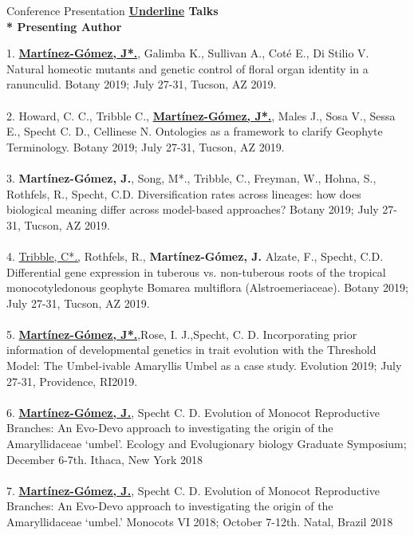 \documentclass{resume} %
\begin{document}
\begin{rSection}{Conference Presentation} 
\textbf{\underline{Underline} \textendash Talks}\\
\textbf{ * \textendash Presenting Author }

\begin{enumerate}[leftmargin=0cm]

1. \underline{\textbf{Mart\'{i}nez-G\'{o}mez, J*.}}, Galimba K., Sullivan A., Cot\'{e} E., Di Stilio V.
Natural homeotic mutants and genetic control of floral organ identity in a ranunculid.
Botany 2019; July 27-31, Tucson, AZ 2019. \\
\\
2. Howard, C. C., Tribble C., \underline{\textbf{Mart\'{i}nez-G\'{o}mez, J*.}}, Males J., Sosa V., Sessa E., Specht C. D., Cellinese N. 
Ontologies as a framework to clarify Geophyte Terminology. Botany 2019; July 27-31, Tucson, AZ 2019. \\
\\
3. \textbf{Mart\'{i}nez-G\'{o}mez, J.}, Song, M*., Tribble, C.,  Freyman, W., Hohna, S., Rothfels, R., Specht, C.D.
Diversification rates across lineages: how does biological meaning differ across model-based approaches?
Botany 2019; July 27-31, Tucson, AZ 2019. \\
\\
4. \underline{Tribble, C*.,} Rothfels, R., \textbf{Mart\'{i}nez-G\'{o}mez, J.} Alzate, F., Specht, C.D. Differential gene expression in tuberous vs. non-tuberous roots of the tropical monocotyledonous geophyte Bomarea multiflora (Alstroemeriaceae).
Botany 2019; July 27-31, Tucson, AZ 2019. \\
\\
5. \underline{\textbf{Mart\'{i}nez-G\'{o}mez, J*.}},Rose, I. J.,Specht, C. D.
Incorporating prior information of developmental genetics in trait evolution with the Threshold Model: The Umbel-ivable Amaryllis Umbel as a case study. 
Evolution 2019; July 27-31, Providence,  RI2019. \\
\\
6. \underline{\textbf{Mart\'{i}nez-G\'{o}mez, J.}}, Specht C. D. Evolution of Monocot Reproductive Branches: An Evo-Devo approach to investigating the origin
of the Amaryllidaceae ‘umbel’. Ecology and Evolugionary biology Graduate Symposium; December 6-7th. Ithaca, New York 2018\\
\\
7. \underline{\textbf{Mart\'{i}nez-G\'{o}mez, J.}}, Specht C. D. Evolution of Monocot Reproductive Branches: An Evo-Devo approach to investigating the origin of the Amaryllidaceae ‘umbel.’ Monocots VI 2018; October 7-12th. Natal, Brazil 2018\\

\end{enumerate}
\end{rSection}
\end{document}
